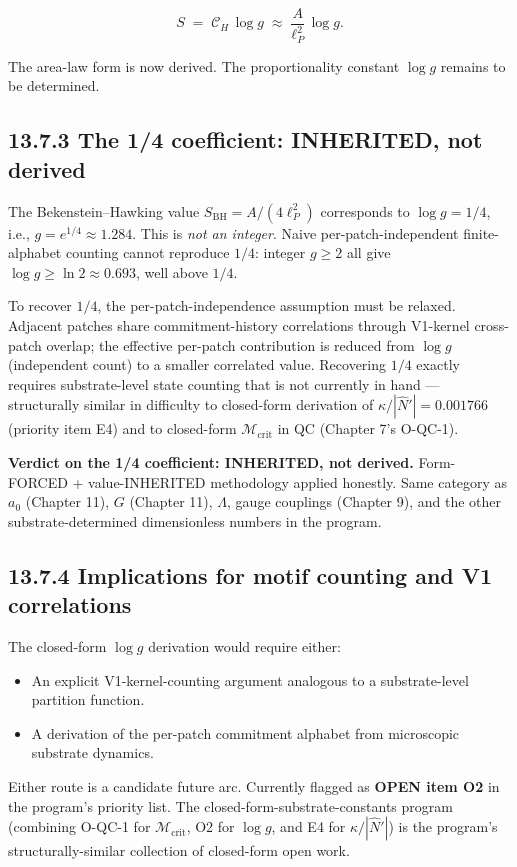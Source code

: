 \documentclass[11pt]{book}
\begin{document}
\[
S \;=\; \mathcal{C}_H\,\log g \;\approx\; \frac{A}{\ell_P^2}\,\log g.
\]

The area-law form is now derived. The proportionality constant $\log g$ remains to be determined.

\subsection{13.7.3 The 1/4 coefficient: INHERITED, not derived}

The Bekenstein–Hawking value $S_\mathrm{BH} = A/(4\ell_P^2)$ corresponds to $\log g = 1/4$, i.e., $g = e^{1/4} \approx 1.284$. This is \textit{not an integer}. Naive per-patch-independent finite-alphabet counting cannot reproduce $1/4$: integer $g \geq 2$ all give $\log g \geq \ln 2 \approx 0.693$, well above $1/4$.

To recover $1/4$, the per-patch-independence assumption must be relaxed. Adjacent patches share commitment-history correlations through V1-kernel cross-patch overlap; the effective per-patch contribution is reduced from $\log g$ (independent count) to a smaller correlated value. Recovering $1/4$ exactly requires substrate-level state counting that is not currently in hand — structurally similar in difficulty to closed-form derivation of $\kappa/|\hat{N}'| = 0.001766$ (priority item E4) and to closed-form $\mathcal{M}_\mathrm{crit}$ in QC (Chapter 7's O-QC-1).

\textbf{Verdict on the 1/4 coefficient: INHERITED, not derived.} Form-FORCED + value-INHERITED methodology applied honestly. Same category as $a_0$ (Chapter 11), $G$ (Chapter 11), $\Lambda$, gauge couplings (Chapter 9), and the other substrate-determined dimensionless numbers in the program.

\subsection{13.7.4 Implications for motif counting and V1 correlations}

The closed-form $\log g$ derivation would require either:
\begin{itemize}
\item An explicit V1-kernel-counting argument analogous to a substrate-level partition function.
\item A derivation of the per-patch commitment alphabet from microscopic substrate dynamics.
\end{itemize}

Either route is a candidate future arc. Currently flagged as \textbf{OPEN item O2} in the program's priority list. The closed-form-substrate-constants program (combining O-QC-1 for $\mathcal{M}_\mathrm{crit}$, O2 for $\log g$, and E4 for $\kappa/|\hat{N}'|$) is the program's structurally-similar collection of closed-form open work.
\end{document}
